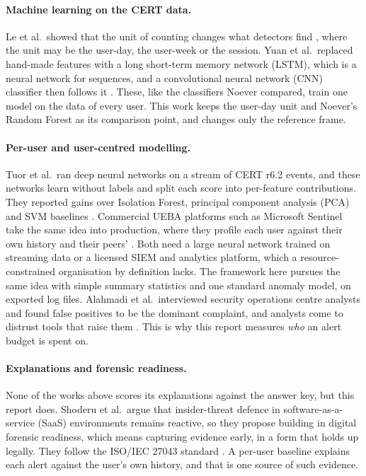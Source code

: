 \documentclass[a4paper,12pt]{article}
\begin{document}
\paragraph{Machine learning on the CERT data.} Le et al.\ showed that the unit of counting changes what detectors find \cite{Le2020}, where the unit may be the user-day, the user-week or the session. Yuan et al.\ replaced hand-made features with a long short-term memory network (LSTM), which is a neural network for sequences, and a convolutional neural network (CNN) classifier then follows it \cite{Yuan2018}. These, like the classifiers Noever compared, train one model on the data of every user. This work keeps the user-day unit and Noever's Random Forest as its comparison point, and changes only the reference frame.

\paragraph{Per-user and user-centred modelling.} Tuor et al.\ ran deep neural networks on a stream of CERT r6.2 events, and these networks learn without labels and split each score into per-feature contributions. They reported gains over Isolation Forest, principal component analysis (PCA) and SVM baselines \cite{Tuor2017}. Commercial UEBA platforms such as Microsoft Sentinel take the same idea into production, where they profile each user against their own history and their peers' \cite{MSSentinelUEBA}. Both need a large neural network trained on streaming data or a licensed SIEM and analytics platform, which a resource-constrained organisation by definition lacks. The framework here pursues the same idea with simple summary statistics and one standard anomaly model, on exported log files. Alahmadi et al.\ interviewed security operations centre analysts and found false positives to be the dominant complaint, and analysts come to distrust tools that raise them \cite{Alahmadi2022}. This is why this report measures \emph{who} an alert budget is spent on.

\paragraph{Explanations and forensic readiness.} None of the works above scores its explanations against the answer key, but this report does. Shoderu et al.\ argue that insider-threat defence in software-as-a-service (SaaS) environments remains reactive, so they propose building in digital forensic readiness, which means capturing evidence early, in a form that holds up legally. They follow the ISO/IEC 27043 standard \cite{Shoderu2026}. A per-user baseline explains each alert against the user's own history, and that is one source of such evidence.
\end{document}
